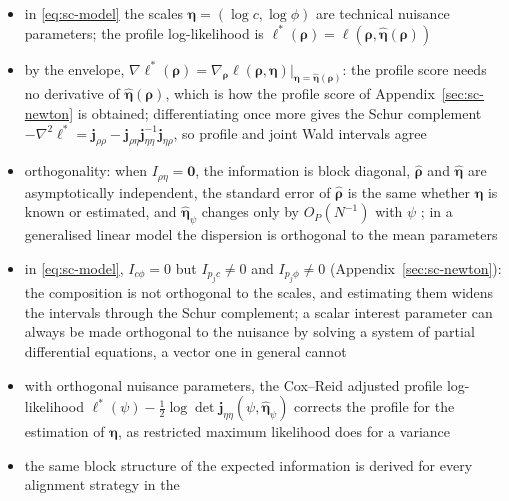 \begin{itemize}
  \item in \eqref{eq:sc-model} the scales \(\boldsymbol{\eta}=(\log c,\log\phi)\) are technical nuisance parameters; the profile
        log-likelihood is \(\ell^{\ast}(\boldsymbol{\rho})=\ell(\boldsymbol{\rho},\hat{\boldsymbol{\eta}}(\boldsymbol{\rho}))\)
  \item by the \gls{envelope}, \(\nabla\ell^{\ast}(\boldsymbol{\rho})=\nabla_{\boldsymbol{\rho}}\ell(\boldsymbol{\rho},\boldsymbol{\eta})\rvert_{\boldsymbol{\eta}=\hat{\boldsymbol{\eta}}(\boldsymbol{\rho})}\): the profile score
        needs no derivative of \(\hat{\boldsymbol{\eta}}(\boldsymbol{\rho})\), which is how the profile score of
        Appendix~\ref{sec:sc-newton} is obtained; differentiating once more gives the Schur complement
        \(-\nabla^{2}\ell^{\ast}=\boldsymbol{j}_{\rho\rho}-\boldsymbol{j}_{\rho\eta}\boldsymbol{j}_{\eta\eta}^{-1}\boldsymbol{j}_{\eta\rho}\), so profile and joint Wald intervals agree
  \item \gls{orthogonality}: when \(I_{\rho\eta}=\boldsymbol{0}\), the information is block diagonal, \(\hat{\boldsymbol{\rho}}\) and \(\hat{\boldsymbol{\eta}}\) are
        asymptotically independent, the standard error of \(\hat{\boldsymbol{\rho}}\) is the same whether \(\boldsymbol{\eta}\) is known or estimated,
        and \(\hat{\boldsymbol{\eta}}_{\psi}\) changes only by \(O_{P}(N^{-1})\) with \(\psi\) \cite[Sect.~2.2]{coxParameterOrthogonalityApproximate1987};
        in a generalised linear model the dispersion is orthogonal to the mean parameters
  \item in \eqref{eq:sc-model}, \(I_{c\phi}=0\) but \(I_{p_{j}c}\neq0\) and \(I_{p_{j}\phi}\neq0\) (Appendix~\ref{sec:sc-newton}): the
        composition is not orthogonal to the scales, and estimating them widens the intervals through the
        Schur complement; a scalar interest parameter can always be made orthogonal to the nuisance by
        solving a system of partial differential equations, a vector one in general cannot
        \cite[Sect.~2.3]{coxParameterOrthogonalityApproximate1987}
  \item with orthogonal nuisance parameters, the Cox--Reid adjusted profile log-likelihood
        \(\ell^{\ast}(\psi)-\tfrac12\log\det\boldsymbol{j}_{\eta\eta}(\psi,\hat{\boldsymbol{\eta}}_{\psi})\) corrects the profile for the estimation of
        \(\boldsymbol{\eta}\), as restricted maximum likelihood does for a variance
        \cite{coxParameterOrthogonalityApproximate1987}
  \item the same block structure of the expected information is derived for every alignment strategy in the
\end{itemize}

